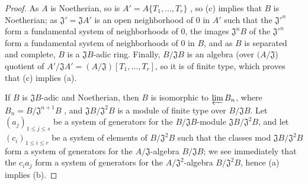 \begin{proof}
As $A$ is Noetherian, so is $A'=A\{T_1,\dots,T_r\}$ , so
(c) implies that $B$ is Noetherian; as $\mathfrak{J}'=\mathfrak{J}A'$ is an open neighborhood
of $0$ in $A'$ such that the ${\mathfrak{J}'}^n$ form a fundamental system of neighborhoods of
$0$, the images $\mathfrak{J}^n B$ of the ${\mathfrak{J}'}^n$ form a fundamental system of
neighborhoods of $0$ in $B$, and as $B$ is separated and complete, $B$ is a $\mathfrak{J}B$-adic
ring. Finally, $B/\mathfrak{J}B$ is an algebra (over $(A/\mathfrak{J}$) quotient of
$A'/\mathfrak{J}A'=(A/\mathfrak{J})[T_1,\dots,T_r]$, so it is of finite type, which proves that
(c) implies (a).

If $B$ is $\mathfrak{J}B$-adic and Noetherian, then $B$ is isomorphic to $\varprojlim B_n$, where
$B_n=B/\mathfrak{J}^{n+1}B$ , and $\mathfrak{J}B/\mathfrak{J}^2 B$
is a module of finite type over $B/\mathfrak{J}B$. Let $(a_j)_{1\leq j\leq s}$ be a
system of generators for the $B/\mathfrak{J}B$-module $\mathfrak{J}B/\mathfrak{J}^2 B$, and let
$(c_i)_{1\leq i\leq r}$ be a system of elements of $B/\mathfrak{J}^2 B$ such that the
classes
mod $\mathfrak{J}B/\mathfrak{J}^2 B$ form a system of generators for the $A/\mathfrak{J}$-algebra
$B/\mathfrak{J}B$; we see immediately that the $c_i a_j$ form a system of generators for the
$A/\mathfrak{J}^2$-algebra $B/\mathfrak{J}^2 B$, hence (a) implies (b).


\end{proof}

